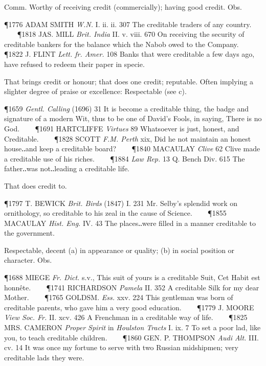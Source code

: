 \begin{description}[wide, labelwidth=!, labelindent=0pt]
\begin{myenumerate}
 Comm. Worthy of receiving credit (commercially); having good credit. Obs.

\P 1776 ADAM  SMITH \textit{W.N.} I. ii. ii. 307 The creditable traders of any country.    
\P 1818 JAS.  MILL \textit{Brit. India} II. v. viii. 670 On receiving the security of creditable bankers for the balance which the Nabob owed to the Company.    
\P 1822 J. FLINT  \textit{Lett. fr. Amer.} 108 Banks that were creditable a few days ago, have refused to redeem their paper in specie.

 That brings credit or honour; that does one credit; reputable. Often implying a slighter degree of praise or excellence: Respectable (see c).

\P 1659 \textit{Gentl.  Calling} (1696) 31 It is become a creditable thing, the badge and signature of a modern Wit, thus to be one of David's Fools, in saying, There is no God.    
\P 1691 HARTCLIFFE  \textit{Virtues} 89 Whatsoever is just, honest, and Creditable.    
\P 1828 SCOTT  \textit{F.M. Perth} xix, Did he not maintain an honest house‥and keep a creditable board?    
\P 1840 MACAULAY  \textit{Clive} 62 Clive made a creditable use of his riches.    
\P 1884  \textit{Law Rep.} 13 Q. Bench Div. 615 The father‥was not‥leading a creditable life.

 That does credit to.

\P 1797 T. BEWICK  \textit{Brit. Birds} (1847) I. 231 Mr. Selby's splendid work on ornithology, so creditable to his zeal in the cause of Science.    
\P 1855 MACAULAY  \textit{Hist. Eng.} IV. 43 The places‥were filled in a manner creditable to the government.

 Respectable, decent (a) in appearance or quality; (b) in social position or character. Obs.

\P 1688 MIEGE  \textit{Fr. Dict.} s.v., This suit of yours is a creditable Suit, Cet Habit est honnête.    
\P 1741 RICHARDSON  \textit{Pamela} II. 352 A creditable Silk for my dear Mother.    
\P 1765 GOLDSM.  \textit{Ess.} xxv. 224 This gentleman was born of creditable parents, who gave him a very good education.    
\P 1779 J. MOORE  \textit{View Soc. Fr.} II. xcv. 426 A Frenchman in a creditable way of life.    
\P 1825 MRS. CAMERON  \textit{Proper Spirit} in \textit{Houlston Tracts} I. ix. 7 To set a poor lad, like you, to teach creditable children.    
\P 1860 GEN. P. THOMPSON  \textit{Audi Alt.} III. cv. 14 It was once my fortune to serve with two Russian midshipmen; very creditable lads they were.


\end{myenumerate}
\end{description}
